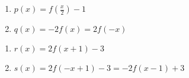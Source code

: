 \documentclass{ximera}
\begin{document}
\begin{multicols}{2}
\begin{enumerate}
\setcounter{enumi}{\value{HW}}

\item   $p(x) = f\left( \frac{x}{2} \right) -1$

\item  $q(x) = -2f(x) = 2f(-x)$ 

\setcounter{HW}{\value{enumi}}
\end{enumerate}
\end{multicols}



\begin{multicols}{2}
\begin{enumerate}
\setcounter{enumi}{\value{HW}}

\item  $r(x) = 2f(x+1)-3$

\item  $s(x) = 2f(-x+1)-3 = -2f(x-1)+3$  

\setcounter{HW}{\value{enumi}}
\end{enumerate}
\end{multicols}
\end{document}
